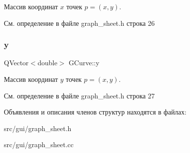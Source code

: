 Массив координат $x$ точек $p = (x,y)$. 

См. определение в файле graph\+\_\+sheet.\+h строка 26

\hypertarget{struct_g_curve_a40d381ce3d5ea2ccf654b9e35a8f594b}{}\label{struct_g_curve_a40d381ce3d5ea2ccf654b9e35a8f594b} 
\subsubsection{\texorpdfstring{y}{y}}
{\footnotesize\ttfamily Q\+Vector$<$double$>$ G\+Curve\+::y}

Массив координат $y$ точек $p = (x,y)$. 

См. определение в файле graph\+\_\+sheet.\+h строка 27



Объявления и описания членов структур находятся в файлах\+:\begin{DoxyCompactItemize}
\item 
src/gui/graph\+\_\+sheet.\+h\item 
src/gui/graph\+\_\+sheet.\+cc\end{DoxyCompactItemize}
